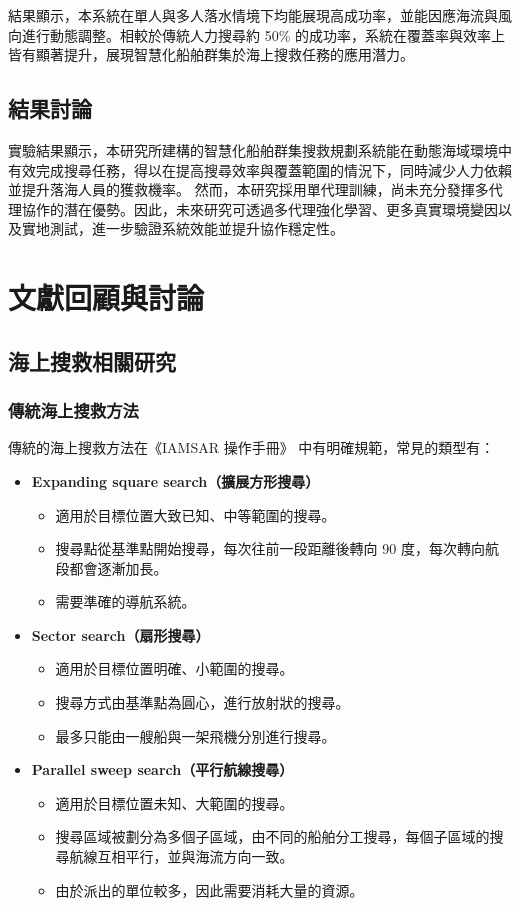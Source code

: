 \documentclass[12pt,a4paper]{article}
\begin{document}
結果顯示，本系統在單人與多人落水情境下均能展現高成功率，並能因應海流與風向進行動態調整。相較於傳統人力搜尋約 50\% 的成功率，系統在覆蓋率與效率上皆有顯著提升，展現智慧化船舶群集於海上搜救任務的應用潛力。


\subsection{結果討論}
實驗結果顯示，本研究所建構的智慧化船舶群集搜救規劃系統能在動態海域環境中有效完成搜尋任務，得以在提高搜尋效率與覆蓋範圍的情況下，同時減少人力依賴並提升落海人員的獲救機率。  然而，本研究採用單代理訓練，尚未充分發揮多代理協作的潛在優勢。因此，未來研究可透過多代理強化學習、更多真實環境變因以及實地測試，進一步驗證系統效能並提升協作穩定性。



\newpage

\section{文獻回顧與討論}

\subsection{海上搜救相關研究}

\subsubsection{傳統海上搜救方法}
傳統的海上搜救方法在《IAMSAR 操作手冊》\cite{IAMSAR2008}\cite{Oways} 中有明確規範，常見的類型有：
\begin{itemize}
	\item \textbf{Expanding square search（擴展方形搜尋）}
	\begin{itemize}
		\item 適用於目標位置大致已知、中等範圍的搜尋。
		\item 搜尋點從基準點開始搜尋，每次往前一段距離後轉向 90 度，每次轉向航段都會逐漸加長。
		\item 需要準確的導航系統。
	\end{itemize}
	\item \textbf{Sector search（扇形搜尋）}
	\begin{itemize}
		\item 適用於目標位置明確、小範圍的搜尋。
		\item 搜尋方式由基準點為圓心，進行放射狀的搜尋。
		\item 最多只能由一艘船與一架飛機分別進行搜尋。
	\end{itemize}
	\item \textbf{Parallel sweep search（平行航線搜尋）}
	\begin{itemize}
		\item 適用於目標位置未知、大範圍的搜尋。
		\item 搜尋區域被劃分為多個子區域，由不同的船舶分工搜尋，每個子區域的搜尋航線互相平行，並與海流方向一致。
		\item 由於派出的單位較多，因此需要消耗大量的資源。
	\end{itemize}
\end{itemize}
\end{document}
